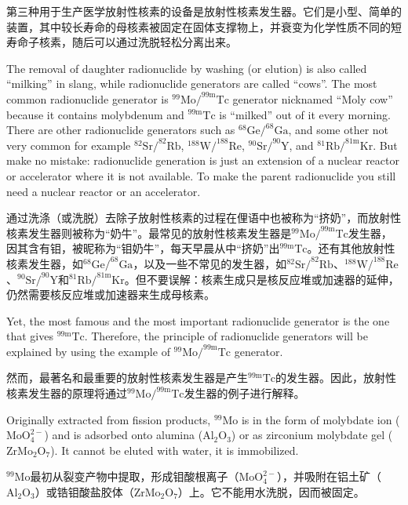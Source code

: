 \documentclass[dvipsnames, svgnames,a4paper,11pt]{article}
\begin{document}
第三种用于生产医学放射性核素的设备是放射性核素发生器。它们是小型、简单的装置，其中较长寿命的母核素被固定在固体支撑物上，并衰变为化学性质不同的短寿命子核素，随后可以通过洗脱轻松分离出来。

The removal of daughter radionuclide by washing (or elution) is also called “milking” in slang, while radionuclide generators are called “cows”. The most common radionuclide generator is $^{99}\text{Mo}/^{99\text{m}}\text{Tc}$ generator nicknamed “Moly cow” because it contains molybdenum and $^{99\text{m}}\text{Tc}$ is “milked” out of it every morning. There are other radionuclide generators such as $^{68}\text{Ge}/^{68}\text{Ga}$, and some other not very common for example $^{82}\text{Sr}/^{82}\text{Rb}$, $^{188}\text{W}/^{188}\text{Re}$, $^{90}\text{Sr}/^{90}\text{Y}$, and $^{81}\text{Rb}/^{81\text{m}}\text{Kr}$. But make no mistake: radionuclide generation is just an extension of a nuclear reactor or accelerator where it is not available. To make the parent radionuclide you still need a nuclear reactor or an accelerator.

通过洗涤（或洗脱）去除子放射性核素的过程在俚语中也被称为“挤奶”，而放射性核素发生器则被称为“奶牛”。最常见的放射性核素发生器是$^{99}\text{Mo}/^{99\text{m}}\text{Tc}$发生器，因其含有钼，被昵称为“钼奶牛”，每天早晨从中“挤奶”出$^{99\text{m}}\text{Tc}$。还有其他放射性核素发生器，如$^{68}\text{Ge}/^{68}\text{Ga}$，以及一些不常见的发生器，如$^{82}\text{Sr}/^{82}\text{Rb}$、$^{188}\text{W}/^{188}\text{Re}$、$^{90}\text{Sr}/^{90}\text{Y}$和$^{81}\text{Rb}/^{81\text{m}}\text{Kr}$。但不要误解：核素生成只是核反应堆或加速器的延伸，仍然需要核反应堆或加速器来生成母核素。

Yet, the most famous and the most important radionuclide generator is the one that gives $^{99\text{m}}\text{Tc}$. Therefore, the principle of radionuclide generators will be explained by using the example of $^{99}\text{Mo}/^{99\text{m}}\text{Tc}$ generator.

然而，最著名和最重要的放射性核素发生器是产生$^{99\text{m}}\text{Tc}$的发生器。因此，放射性核素发生器的原理将通过$^{99}\text{Mo}/^{99\text{m}}\text{Tc}$发生器的例子进行解释。

Originally extracted from fission products, $^{99}\text{Mo}$ is in the form of molybdate ion ($\text{MoO}_4^{2-}$) and is adsorbed onto alumina ($\text{Al}_2\text{O}_3$) or as zirconium molybdate gel ($\text{ZrMo}_2\text{O}_7$). It cannot be eluted with water, it is immobilized.

$^{99}\text{Mo}$最初从裂变产物中提取，形成钼酸根离子（$\text{MoO}_4^{2-}$），并吸附在铝土矿（$\text{Al}_2\text{O}_3$）或锆钼酸盐胶体（$\text{ZrMo}_2\text{O}_7$）上。它不能用水洗脱，因而被固定。
\end{document}
